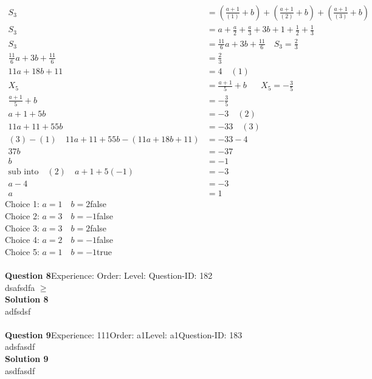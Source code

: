 \documentclass{article}
\begin{document}
\\[-35pt]\begin{align*}
S_3&=\left(\displaystyle\frac{a+1}{(1)}+b\right)+\left(\displaystyle\frac{a+1}{(2)}+b\right)+\left(\displaystyle\frac{a+1}{(3)}+b\right)\\[2pt]
S_3&=a+\displaystyle\frac{a}{2}+\displaystyle\frac{a}{3}+3b+1+\displaystyle\frac{1}{2}+\frac{1}{3}\\[2pt]
S_3&=\displaystyle\frac{11}{6}a+3b+\frac{11}{6}\quad S_3=\frac{2}{3}\\[2pt]
\displaystyle\frac{11}{6}a+3b+\frac{11}{6}&=\frac{2}{3}\\[2pt]
11a+18b+11&=4\quad(1)\\[12pt]
X_5&=\displaystyle\frac{a+1}{5}+b\hspace{20pt}X_5=-\frac{3}{5}\\[2pt]
\displaystyle\frac{a+1}{5}+b&=-\frac{3}{5}\\[2pt]
a+1+5b&=-3 \quad (2)\\[2pt]
11a+11+55b&=-33\quad (3)\\[12pt]
(3)-(1)\quad 11a+11+55b-(11a+18b+11)&=-33-4\\[2pt]
37b&=-37\\[2pt]
b&=-1\\[12pt]
\text{sub into}\quad (2) \quad a+1+5(-1)&=-3\\[2pt]
a-4&=-3\\[2pt]
a&=1
\end{align*}
Choice 1: \hspace{20pt}$a=1\quad b=2$\hspace{20pt}false\\
Choice 2: \hspace{20pt}$a=3 \quad b=-1$\hspace{20pt}false\\
Choice 3: \hspace{20pt}$a=3 \quad b=2$\hspace{20pt}false\\
Choice 4: \hspace{20pt}$a=2 \quad b=-1$\hspace{20pt}false\\
Choice 5: \hspace{20pt}$a=1 \quad b=-1$\hspace{20pt}true\\
\\[4pt]
\noindent\textbf{Question 8}\hspace{20pt}Experience: \hspace{20pt}Order: \hspace{20pt}Level: \hspace{20pt}Question-ID: 182\\[2pt]
dsafsdfa $\geq$\\[4pt]
\noindent\textbf{Solution 8}\\[2pt]
adfsdsf\\[4pt]
\\[4pt]
\noindent\textbf{Question 9}\hspace{20pt}Experience: 111\hspace{20pt}Order: a1\hspace{20pt}Level: a1\hspace{20pt}Question-ID: 183\\[2pt]
adsfasdf\\[4pt]
\noindent\textbf{Solution 9}\\[2pt]
asdfasdf\\[4pt]
\\[4pt]
\end{document}
